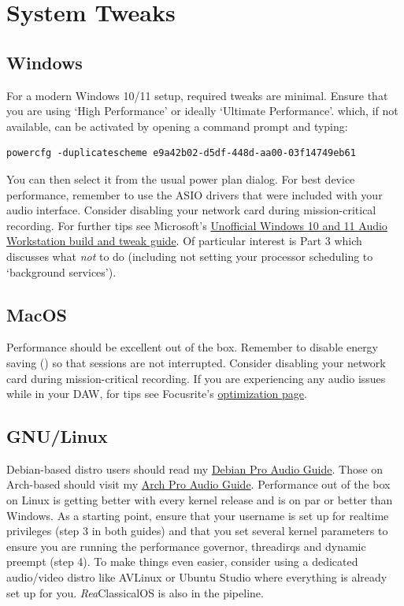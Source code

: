 \documentclass[10pt,american]{article}
\begin{document}
\section{System Tweaks}

\subsection{Windows}

For a modern Windows 10/11 setup, required tweaks are minimal. Ensure that you
are using `High Performance' or ideally `Ultimate Performance'. which, if not
available, can be activated by opening a command prompt and typing: 
\begin{lstlisting}
powercfg -duplicatescheme e9a42b02-d5df-448d-aa00-03f14749eb61
\end{lstlisting}

You can then select it from the usual power plan dialog. For best device
performance, remember to use the ASIO drivers that were included with your audio
interface. Consider disabling your network card during mission-critical
recording. For further tips see Microsoft's
\href{https://devblogs.microsoft.com/windows-music-dev/unofficial-windows-10-audio-workstation-build-and-tweak-guide-part-2/}{Unofficial
Windows 10 and 11 Audio Workstation build and tweak guide}. Of particular
interest is Part 3 which discusses what \emph{not} to do (including not setting
your processor scheduling to `background services').

\subsection{MacOS}

Performance should be excellent out of the box. Remember to disable energy
saving () so that sessions are not
interrupted. Consider disabling your network card during mission-critical
recording. If you are experiencing any audio issues while in your DAW, for tips
see Focusrite's
\href{https://support.focusrite.com/hc/en-gb/sections/360004958539-Optimisation}{optimization
page}.

\subsection{GNU/Linux}

Debian-based distro users should read my
\href{https://github.com/chmaha/DebianProAudio}{Debian Pro Audio Guide}. Those
on Arch-based should visit my \href{https://github.com/chmaha/ArchProAudio}{Arch
Pro Audio Guide}. Performance out of the box on Linux is getting better with
every kernel release and is on par or better than Windows. As a starting point,
ensure that your username is set up for realtime privileges (step 3 in both
guides) and that you set several kernel parameters to ensure you are running the
performance governor, threadirqs and dynamic preempt (step 4). To make things
even easier, consider using a dedicated audio/video distro like AVLinux or
Ubuntu Studio where everything is already set up for you. \emph{Rea}ClassicalOS
is also in the pipeline.
\end{document}
